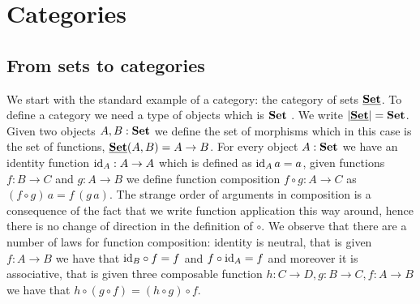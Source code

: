 \chapter{Categories}
\label{chap:categories}

\section{From sets to categories}
\label{sec:from-sets-categories}

We start with the standard example of a category: the category of sets $\underline{\mathbf{\mathbf{Set}}}$. To define a category we need a type of objects which is $\mathbf{Set}$
. We write $|\underline{\mathbf{\mathbf{Set}}}| = \mathbf{Set}$. 
Given two objects $A,B : \mathbf{Set}$ we define the set of morphisms which in this case is the set of functions, $\underline{\mathbf{\mathbf{Set}}}(A,B) = A \to B$. For every object $A : \mathbf{Set}$ we have an identity function $\mathrm{id}_A : A \to A$ which is defined as $\mathrm{id}_A\,a = a$, given functions $f : B \to C$ and $g : A \to B$ we define function composition $f \circ g : A \to C$ as $(f\circ g)\,a = f\,(g\,a)$. The strange order of arguments in composition is a consequence of the fact that we write function application this way around, hence there is no change of direction in the definition of $\circ$. We observe that there are a number of laws for function composition: identity is neutral, that is given $f : A \to B$ we have that $\mathrm{id}_B \circ f = f$ and $f \circ \mathrm{id}_A = f$ and moreover it is associative, that is given three composable function $h : C \to D, g : B \to C, f : A \to B$ we have that $h \circ (g \circ f) = (h \circ g) \circ f$.

